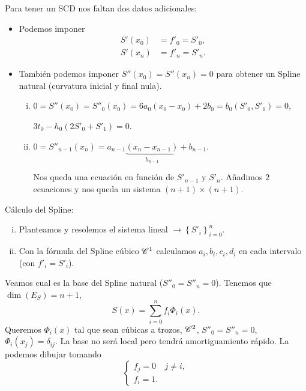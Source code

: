 Para tener un SCD nos faltan dos datos adicionales:
\begin{itemize}
    \item Podemos imponer
        \begin{align*}
            S'\left( x_0 \right) &= f'_0 = S'_0, \\
            S'\left( x_n \right) &= f'_n = S'_n.
        \end{align*}
    \item También podemos imponer $S''\left( x_0 \right) = S''\left( x_n \right) = 0$ para obtener un Spline natural (curvatura inicial y final nula).
        \begin{enumerate}[i)]
            \item $0=S''\left( x_0 \right)=S''_0\left( x_0 \right)=6a_0\left( x_0-x_0 \right)+2b_0 = b_0(S'_0, S'_1) = 0$,

                $3t_0-h_0\left( 2S'_0+S'_1 \right)=0$.
            \item $0=S''_{n-1}\left( x_n \right) = a_{n-1} \underbrace{\left( x_n-x_{n-1} \right)}_{h_{n-1}} + b_{n-1}$.

                Nos queda una ecuación en función de $S'_{n-1}$ y $S'_n$. Añadimos $2$ ecuaciones y nos queda un sistema $\left( n+1 \right)\times \left( n+1 \right)$.
        \end{enumerate}
\end{itemize}

Cálculo del Spline:
\begin{enumerate}[i)]
    \item Planteamos y resolemos el sistema lineal $\rightarrow \left\{ S'_i \right\}_{i=0}^n$.
    \item Con la fórmula del Spline cúbico $\mathscr{C}^1$ calculamos $a_i, b_i, c_i, d_i$ en cada intervalo (con $f'_i=S'_i$).
\end{enumerate}

Veamos cual es la base del Spline natural ($S''_0=S''_n=0$). Tenemos que $\dim\left( E_S \right)=n+1$,
\[
    S\left( x \right) = \sum_{i=0}^n f_i \Phi_i\left( x \right).
\]
Queremos $\Phi_i\left( x \right)$ tal que sean cúbicas a trozos, $\mathscr{C}^2$, $S''_0=S''_n=0$, $\Phi_i\left( x_j \right) = \delta_{ij}$. La base no será local pero tendrá amortiguamiento rápido. La podemos dibujar tomando
\[
    \begin{cases}
        f_j = 0 & j\neq i, \\
        f_i = 1.
    \end{cases}
\]

